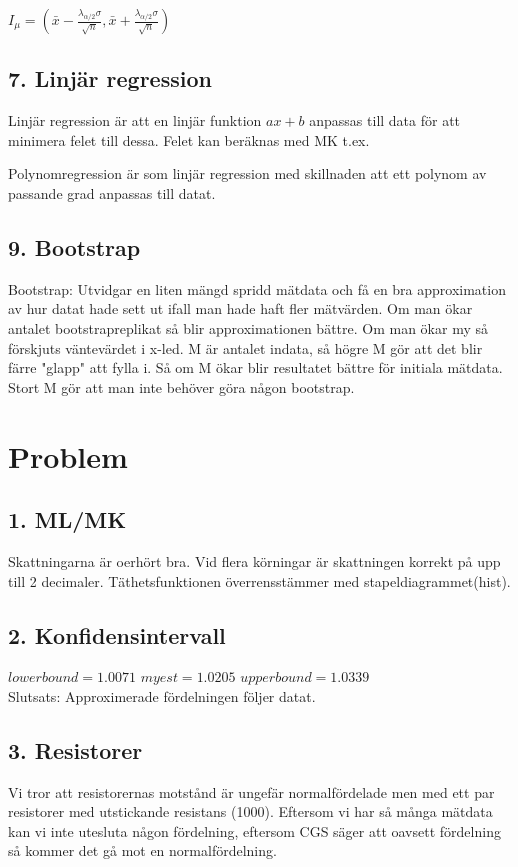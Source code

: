 \documentclass{article}
\begin{document}
$I_{{\mu }}=({\bar  {x}}-{\frac  {\lambda _{{\alpha /2}}\sigma }{{\sqrt
{n}}}},{\bar  {x}}+{\frac  {\lambda _{{\alpha /2}}\sigma }{{\sqrt  {n}}}})$

\subsection*{7. Linjär regression}
Linjär regression är att en linjär funktion $ax+b$ anpassas till data för att
minimera felet till dessa. Felet kan beräknas med MK t.ex.

Polynomregression är som linjär regression med skillnaden att ett polynom av
passande grad anpassas till datat.


\subsection*{9. Bootstrap}
Bootstrap: Utvidgar en liten mängd spridd mätdata och få en bra approximation av
hur datat hade sett ut ifall man hade haft fler mätvärden. Om man ökar antalet
bootstrapreplikat så blir approximationen bättre.
Om man ökar my så förskjuts väntevärdet i x-led.
M är antalet indata, så högre M gör att det blir färre "glapp" att fylla i. Så
om M ökar blir resultatet bättre för initiala mätdata. Stort M gör att man inte
behöver göra någon bootstrap.

\section{Problem}
\subsection*{1. ML/MK}
Skattningarna är oerhört bra. Vid flera körningar är skattningen korrekt på upp
till 2 decimaler. Täthetsfunktionen överrensstämmer med stapeldiagrammet(hist).

\subsection*{2. Konfidensintervall}
$lower bound = 1.0071$
$my est = 1.0205$
$upper bound = 1.0339$\\
Slutsats: Approximerade fördelningen följer datat.


\subsection*{3. Resistorer}
Vi tror att resistorernas motstånd är ungefär normalfördelade men med ett par
resistorer med utstickande resistans (1000). Eftersom vi har så många mätdata
kan vi inte utesluta någon fördelning, eftersom CGS säger att oavsett fördelning
så kommer det gå mot en normalfördelning.
\end{document}

